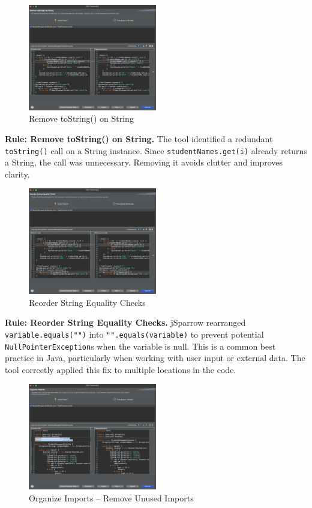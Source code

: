 \documentclass[a4paper,12pt]{article}
\begin{document}
\begin{figure}[H]
  \centering
  \includegraphics[width=0.5\textwidth]{issue-6.png}
  \caption{Remove toString() on String}
  \label{fig:issue-6}
\end{figure}

\textbf{Rule: Remove toString() on String.} The tool identified a redundant \texttt{toString()} call on a String instance. Since \texttt{studentNames.get(i)} already returns a String, the call was unnecessary. Removing it avoids clutter and improves clarity.

\begin{figure}[H]
  \centering
  \includegraphics[width=0.5\textwidth]{issue-7-8.png}
  \caption{Reorder String Equality Checks}
  \label{fig:issue-7-8}
\end{figure}

\textbf{Rule: Reorder String Equality Checks.} jSparrow rearranged \texttt{variable.equals("")} into \texttt{"".equals(variable)} to prevent potential \texttt{NullPointerException}s when the variable is null. This is a common best practice in Java, particularly when working with user input or external data. The tool correctly applied this fix to multiple locations in the code.

\begin{figure}[H]
  \centering
  \includegraphics[width=0.5\textwidth]{issue-9.png}
  \caption{Organize Imports – Remove Unused Imports}
  \label{fig:issue-9}
\end{figure}
\end{document}
